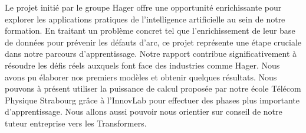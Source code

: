 Le projet initié par le groupe Hager offre une opportunité enrichissante pour explorer les applications pratiques de l'intelligence artificielle au sein de notre formation. En traitant un problème concret tel que l'enrichissement de leur base de données pour prévenir les défauts d'arc, ce projet représente une étape cruciale dans notre parcours d'apprentissage. Notre rapport contribue significativement à résoudre les défis réels auxquels font face des industries comme Hager. Nous avons pu élaborer nos premiers modèles et obtenir quelques résultats. Nous pouvons à présent utiliser la puissance de calcul proposée par notre école Télécom Physique Strabourg grâce à l'InnovLab pour effectuer des phases plus importante d'apprentissage. Nous allons aussi pouvoir nous orientier sur conseil de notre tuteur entreprise vers les Transformers. 